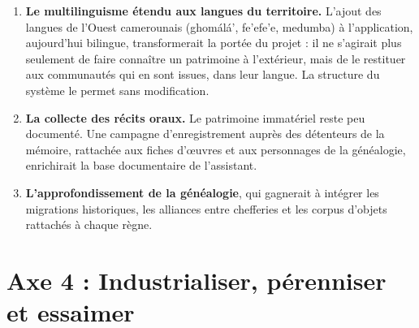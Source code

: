 \begin{enumerate}
  \item \textbf{Le multilinguisme étendu aux langues du territoire.} L'ajout des
        langues de l'Ouest camerounais (ghomálá', fe'efe'e, medumba) à
        l'application, aujourd'hui bilingue, transformerait la portée du projet :
        il ne s'agirait plus seulement de faire connaître un patrimoine à
        l'extérieur, mais de le restituer aux communautés qui en sont issues,
        dans leur langue. La structure du système le permet sans modification.

  \item \textbf{La collecte des récits oraux.} Le patrimoine immatériel reste
        peu documenté. Une campagne d'enregistrement auprès des détenteurs de la
        mémoire, rattachée aux fiches d'œuvres et aux personnages de la
        généalogie, enrichirait la base documentaire de l'assistant.

  \item \textbf{L'approfondissement de la généalogie}, qui gagnerait à intégrer
        les migrations historiques, les alliances entre chefferies et les corpus
        d'objets rattachés à chaque règne.
\end{enumerate}

\section*{Axe 4 : Industrialiser, pérenniser et essaimer}

